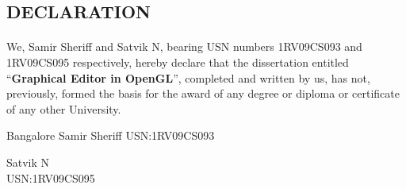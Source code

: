 \documentclass[12pt]{report}
\begin{document}
\begin{titlepage}
\begin{center}
\section*{DECLARATION}
\end{center}

\paragraph{}  We, Samir Sheriff and Satvik N, bearing USN numbers 1RV09CS093 and 1RV09CS095 respectively, hereby declare that the dissertation entitled ``\textbf{Graphical Editor in OpenGL}'', completed and written by us, has not, previously, formed the basis for the award of any degree or diploma or certificate of any other University.
\vspace{1in}

\begin{flushright} {Bangalore \hspace{4.4in} Samir Sheriff } 
 {USN:1RV09CS093}
 \end{flushright}

\begin{flushright} { Satvik N } \\
 {USN:1RV09CS095}
 \end{flushright}
\end{titlepage}
%
\end{document}

